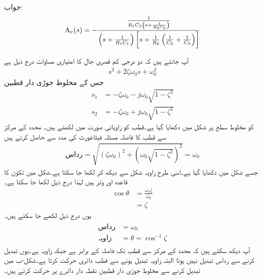 جواب:
\begin{align*}
{\ensuremath{{\textup{A}}}}_v(s)=-\frac{\frac{1}{R_1 C_3 \left(s+\frac{1}{R_2 C_2}\right)}}{\left(s+\frac{1}{R_1C_1}\right)\left[s+\frac{1}{R_2}\left(\frac{1}{C_2}+\frac{1}{C_3}\right)\right]}
\end{align*}

آپ جانتے ہیں کہ دو درجی کم قصری جال کا امتیازی مساوات درج ذیل ہے
\begin{align*}
s^2+2\zeta \omega_0 s+\omega_0^2
\end{align*}
جس کے مخلوط جوڑی دار قطبین
\begin{align*}
s_1&=-\zeta \omega_0-j\omega_0 \sqrt{1-\zeta^2}\\
s_2&=-\zeta \omega_0+j\omega_0 \sqrt{1-\zeta^2}
\end{align*}
کو مخلوط سطح پر شکل  میں دکھایا گیا ہے۔قطب  کو زاویائی صورت میں لکھتے ہیں۔ محدد کے مرکز  سے قطب کا فاصلہ مسئلہ فیثاغورث کی مدد سے حاصل کرتے ہیں
\begin{align*}
\text{رداس}=\sqrt{(\zeta \omega_0)^2+\left(\omega_0\sqrt{1-\zeta^2}\right)^2}=\omega_0
\end{align*}
جسے شکل میں   دکھایا گیا ہے۔اسی طرح زاویہ  شکل سے دیکھ کر لکھا جا سکتا ہے۔شکل میں تکون کا قاعدہ  اور وتر  ہیں لہٰذا درج ذیل لکھا جا سکتا ہے۔
\begin{align*}
\cos \theta&=\frac{\omega_0 \zeta}{\omega_0}\\
&=\zeta
\end{align*}
یوں درج ذیل لکھے جا سکتے ہیں۔
\begin{gather}
\begin{aligned}
\text{رداس}&=\omega_0\\
\text{زاویہ}&=\theta=\cos^{-1} \zeta
\end{aligned}
\end{gather}
آپ دیکھ سکتے ہیں کہ محدد کے مرکز سے قطب تک فاصلہ  کے برابر ہے جبکہ زاویہ  ہے۔یوں  تبدیل کرنے سے رداس تبدیل نہیں ہوتا البتہ زاویہ تبدیل ہونے سے قطب دائری حرکت کرتا ہے۔شکل-ب میں  تبدیل کرنے سے مخلوط جوڑی دار قطبین نقطہ دار دائرے پر حرکت کرتے ہیں۔
